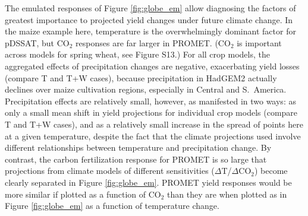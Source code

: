 \documentclass[gmd, manuscript]{copernicus} %
\begin{document}

The emulated responses of Figure \ref{fig:globe_em} allow diagnosing the factors of greatest importance to projected yield changes under future climate change. In the maize example here, temperature is the overwhelmingly dominant factor for pDSSAT, but CO$_2$ responses are far larger in PROMET. (CO$_2$ is important across models for spring wheat, see Figure S13.) For all crop models, the aggregated effects of precipitation changes are negative, exacerbating yield losses (compare T and T+W cases), because precipitation in HadGEM2 actually declines over maize cultivation regions, especially in Central and S.\ America. Precipitation effects are relatively small, however, as manifested in two ways: as only a small mean shift in yield projections for individual crop models (compare T and T+W cases), and as a relatively small increase in the spread of points here at a given temperature, despite the fact that the climate projections used involve different relationships between temperature and precipitation change.  By contrast, the carbon fertilization response for PROMET is so large that projections from climate models of different sensitivities ($\Delta$T/$\Delta$CO$_2$) become clearly separated in Figure \ref{fig:globe_em}. PROMET yield responses would be more similar if plotted as a function of CO$_2$ than they are when plotted as in Figure \ref{fig:globe_em} as a function of temperature change. 
\end{document}
